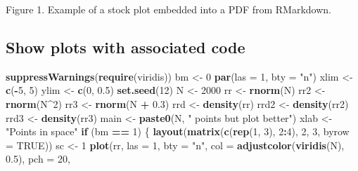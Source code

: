 \documentclass[article]{article}
\newenvironment{Shaded}{\begin{snugshade}}{\end{snugshade}}
\newcommand{\KeywordTok}[1]{\textcolor[rgb]{0.13,0.29,0.53}{\textbf{#1}}}
\newcommand{\DataTypeTok}[1]{\textcolor[rgb]{0.13,0.29,0.53}{#1}}
\newcommand{\DecValTok}[1]{\textcolor[rgb]{0.00,0.00,0.81}{#1}}
\newcommand{\FloatTok}[1]{\textcolor[rgb]{0.00,0.00,0.81}{#1}}
\newcommand{\StringTok}[1]{\textcolor[rgb]{0.31,0.60,0.02}{#1}}
\newcommand{\OtherTok}[1]{\textcolor[rgb]{0.56,0.35,0.01}{#1}}
\newcommand{\ControlFlowTok}[1]{\textcolor[rgb]{0.13,0.29,0.53}{\textbf{#1}}}
\newcommand{\OperatorTok}[1]{\textcolor[rgb]{0.81,0.36,0.00}{\textbf{#1}}}
\newcommand{\NormalTok}[1]{#1}
\begin{document}
Figure 1. Example of a stock plot embedded into a PDF from RMarkdown.

\newpage

\subsection{Show plots with associated
code}\label{show-plots-with-associated-code}

\begin{Shaded}
\begin{Highlighting}[]
\KeywordTok{suppressWarnings}\NormalTok{(}\KeywordTok{require}\NormalTok{(viridis))}
\NormalTok{bm <-}\StringTok{ }\DecValTok{0}
\KeywordTok{par}\NormalTok{(}\DataTypeTok{las =} \DecValTok{1}\NormalTok{, }\DataTypeTok{bty =} \StringTok{"n"}\NormalTok{)}
\NormalTok{xlim <-}\StringTok{ }\KeywordTok{c}\NormalTok{(}\OperatorTok{-}\DecValTok{5}\NormalTok{, }\DecValTok{5}\NormalTok{)}
\NormalTok{ylim <-}\StringTok{ }\KeywordTok{c}\NormalTok{(}\DecValTok{0}\NormalTok{, }\FloatTok{0.5}\NormalTok{)}
\KeywordTok{set.seed}\NormalTok{(}\DecValTok{12}\NormalTok{)}
\NormalTok{N <-}\StringTok{ }\DecValTok{2000}
\NormalTok{rr <-}\StringTok{ }\KeywordTok{rnorm}\NormalTok{(N)}
\NormalTok{rr2 <-}\StringTok{ }\KeywordTok{rnorm}\NormalTok{(N}\OperatorTok{^}\DecValTok{2}\NormalTok{)}
\NormalTok{rr3 <-}\StringTok{ }\KeywordTok{rnorm}\NormalTok{(N }\OperatorTok{+}\StringTok{ }\FloatTok{0.3}\NormalTok{)}
\NormalTok{rrd <-}\StringTok{ }\KeywordTok{density}\NormalTok{(rr)}
\NormalTok{rrd2 <-}\StringTok{ }\KeywordTok{density}\NormalTok{(rr2)}
\NormalTok{rrd3 <-}\StringTok{ }\KeywordTok{density}\NormalTok{(rr3)}
\NormalTok{main <-}\StringTok{ }\KeywordTok{paste0}\NormalTok{(N, }\StringTok{" points but plot better"}\NormalTok{)}
\NormalTok{xlab <-}\StringTok{ "Points in space"}
\ControlFlowTok{if}\NormalTok{ (bm }\OperatorTok{==}\StringTok{ }\DecValTok{1}\NormalTok{) \{}
    \KeywordTok{layout}\NormalTok{(}\KeywordTok{matrix}\NormalTok{(}\KeywordTok{c}\NormalTok{(}\KeywordTok{rep}\NormalTok{(}\DecValTok{1}\NormalTok{, }
        \DecValTok{3}\NormalTok{), }\DecValTok{2}\OperatorTok{:}\DecValTok{4}\NormalTok{), }\DecValTok{2}\NormalTok{, }\DecValTok{3}\NormalTok{, }\DataTypeTok{byrow =} \OtherTok{TRUE}\NormalTok{))}
\NormalTok{    sc <-}\StringTok{ }\DecValTok{1}
    \KeywordTok{plot}\NormalTok{(rr, }\DataTypeTok{las =} \DecValTok{1}\NormalTok{, }\DataTypeTok{bty =} \StringTok{"n"}\NormalTok{, }
        \DataTypeTok{col =} \KeywordTok{adjustcolor}\NormalTok{(}\KeywordTok{viridis}\NormalTok{(N), }
            \FloatTok{0.5}\NormalTok{), }\DataTypeTok{pch =} \DecValTok{20}\NormalTok{, }

\end{Highlighting}
\end{Shaded}
\end{document}
